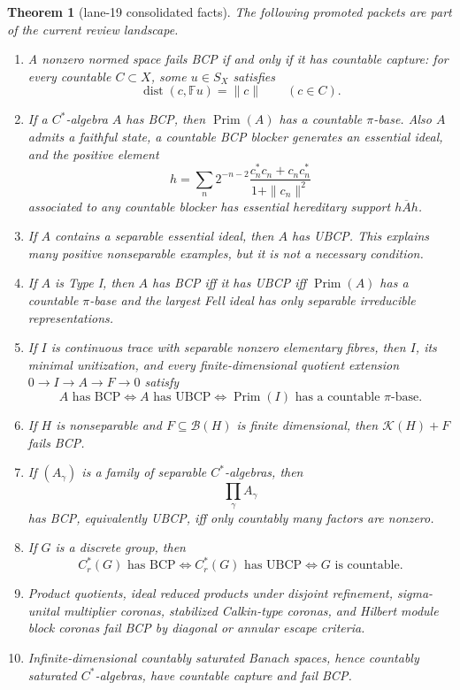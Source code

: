 \documentclass[11pt]{article}
\newtheorem{theorem}{Theorem}
\newcommand{\Prim}{\operatorname{Prim}}
\newcommand{\Kcal}{\mathcal K}
\newcommand{\dist}{\operatorname{dist}}
\begin{document}
\begin{theorem}[lane-19 consolidated facts]
The following promoted packets are part of the current review landscape.
\begin{enumerate}
\item A nonzero normed space fails BCP if and only if it has countable capture:
for every countable \(C\subset X\), some \(u\in S_X\) satisfies
\[
        \dist(c,\mathbb F u)=\|c\| \qquad(c\in C).
\]

\item If a \(C^*\)-algebra \(A\) has BCP, then \(\Prim(A)\) has a countable
\(\pi\)-base.  Also \(A\) admits a faithful state, a countable BCP blocker
generates an essential ideal, and the positive element
\[
        h=\sum_n 2^{-n-2}
        \frac{c_n^*c_n+c_nc_n^*}{1+\|c_n\|^2}
\]
associated to any countable blocker has essential hereditary support
\(\overline{hAh}\).

\item If \(A\) contains a separable essential ideal, then \(A\) has UBCP.
This explains many positive nonseparable examples, but it is not a necessary
condition.

\item If \(A\) is Type I, then \(A\) has BCP iff it has UBCP iff
\(\Prim(A)\) has a countable \(\pi\)-base and the largest Fell ideal has only
separable irreducible representations.

\item If \(I\) is continuous trace with separable nonzero elementary fibres,
then \(I\), its minimal unitization, and every finite-dimensional quotient
extension \(0\to I\to A\to F\to0\) satisfy
\[
        A\text{ has BCP}
        \Longleftrightarrow
        A\text{ has UBCP}
        \Longleftrightarrow
        \Prim(I)\text{ has a countable }\pi\text{-base}.
\]

\item If \(H\) is nonseparable and \(F\subseteq\mathcal B(H)\) is finite
dimensional, then \(\Kcal(H)+F\) fails BCP.

\item If \((A_\gamma)\) is a family of separable \(C^*\)-algebras, then
\[
        \prod_\gamma A_\gamma
\]
has BCP, equivalently UBCP, iff only countably many factors are nonzero.

\item If \(G\) is a discrete group, then
\[
        C^*_r(G)\text{ has BCP}
        \Longleftrightarrow
        C^*_r(G)\text{ has UBCP}
        \Longleftrightarrow
        G\text{ is countable}.
\]

\item Product quotients, ideal reduced products under disjoint refinement,
sigma-unital multiplier coronas, stabilized Calkin-type coronas, and Hilbert
module block coronas fail BCP by diagonal or annular escape criteria.

\item Infinite-dimensional countably saturated Banach spaces, hence
countably saturated \(C^*\)-algebras, have countable capture and fail BCP.
\end{enumerate}
\end{theorem}
\end{document}
